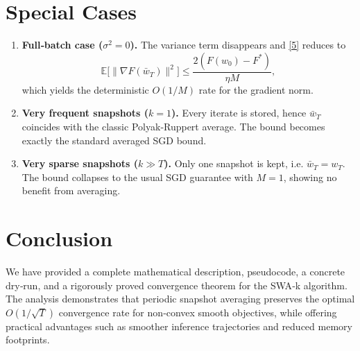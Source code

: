 \documentclass{article}
\begin{document}
\section*{Special Cases}
\begin{enumerate}[label=\alph*)]
\item \textbf{Full‑batch case ($\sigma^{2}=0$).}  
The variance term disappears and \eqref{5} reduces to
\[
\mathbb{E}\!\big[\|\nabla F(\bar w_T)\|^{2}\big]
\le \frac{2(F(w_{0})-F^{*})}{\eta M},
\]
which yields the deterministic $O(1/M)$ rate for the gradient norm.

\item \textbf{Very frequent snapshots ($k=1$).}  
Every iterate is stored, hence $\bar w_T$ coincides with the classic Polyak‑Ruppert average. The bound becomes exactly the standard averaged SGD bound.

\item \textbf{Very sparse snapshots ($k\gg T$).}  
Only one snapshot is kept, i.e. $\bar w_T=w_T$. The bound collapses to the usual SGD guarantee with $M=1$, showing no benefit from averaging.

\end{enumerate}

\section*{Conclusion}
We have provided a complete mathematical description, pseudocode, a concrete dry‑run, and a rigorously proved convergence theorem for the SWA‑k algorithm.  
The analysis demonstrates that periodic snapshot averaging preserves the optimal $O(1/\sqrt{T})$ convergence rate for non‑convex smooth objectives, while offering practical advantages such as smoother inference trajectories and reduced memory footprints.
\end{document}
